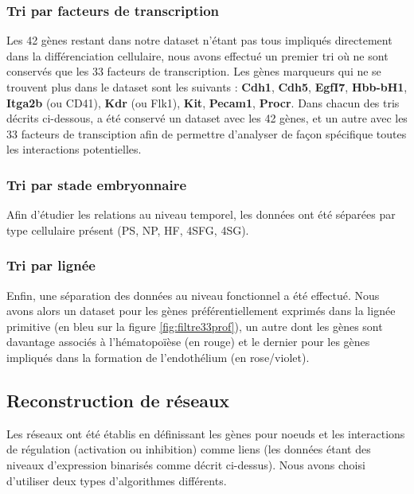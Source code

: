 \documentclass[fleqn,11pt]{SelfArx} %
\begin{document}
\subsubsection{Tri par facteurs de transcription}
Les 42 gènes restant dans notre dataset n'étant pas tous impliqués directement dans la différenciation cellulaire, nous avons effectué un premier tri où ne sont conservés que les 33 facteurs de transcription. Les gènes marqueurs qui ne se trouvent plus dans le dataset sont les suivants : \textbf{Cdh1}, \textbf{Cdh5}, \textbf{EgfI7}, \textbf{Hbb-bH1}, \textbf{Itga2b} (ou CD41), \textbf{Kdr} (ou Flk1), \textbf{Kit}, \textbf{Pecam1}, \textbf{Procr}. Dans chacun des tris décrits ci-dessous, a été conservé un dataset avec les 42 gènes, et un autre avec les 33 facteurs de transciption afin de permettre d'analyser de façon spécifique toutes les interactions potentielles.
\subsubsection{Tri par stade embryonnaire}
Afin d'étudier les relations au niveau temporel, les données ont été séparées par type cellulaire présent (PS, NP, HF, 4SFG, 4SG). 
\subsubsection{Tri par lignée}
Enfin, une séparation des données au niveau fonctionnel a été effectué. Nous avons alors un dataset pour les gènes préférentiellement exprimés dans la lignée primitive (en bleu sur la figure \ref{fig:filtre33prof}), un autre dont les gènes sont davantage associés à l'hématopoïèse (en rouge) et le dernier pour les gènes impliqués dans la formation de l'endothélium (en rose/violet).

\subsection{Reconstruction de réseaux}
Les réseaux ont été établis en définissant les gènes pour noeuds et les interactions de régulation (activation ou inhibition) comme liens (les données étant des niveaux d'expression binarisés comme décrit ci-dessus). Nous avons choisi d'utiliser deux types d'algorithmes différents.
\end{document}
